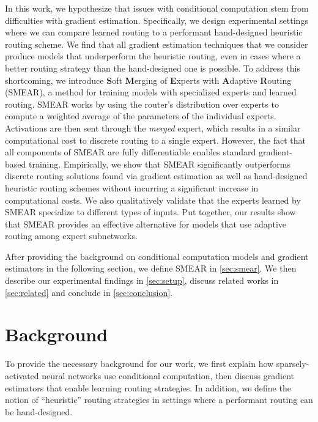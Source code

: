 \documentclass{article}
\theoremstyle{plain}
\theoremstyle{definition}
\theoremstyle{remark}
\begin{document}
In this work, we hypothesize that issues with conditional computation stem from difficulties with gradient estimation.
Specifically, we design experimental settings where we can compare learned routing to a performant hand-designed heuristic routing scheme.
We find that all gradient estimation techniques that we consider produce models that underperform the heuristic routing, even in cases where a better routing strategy than the hand-designed one is possible.
To address this shortcoming, we introduce \textbf{S}oft \textbf{M}erging of \textbf{E}xperts with \textbf{A}daptive \textbf{R}outing (SMEAR), a method for training models with specialized experts and learned routing.
SMEAR works by using the router's distribution over experts to compute a weighted average of the parameters of the individual experts.
Activations are then sent through the \textit{merged} expert, which results in a similar computational cost to discrete routing to a single expert.
However, the fact that all components of SMEAR are fully differentiable enables standard gradient-based training.
Empirically, we show that SMEAR significantly outperforms discrete routing solutions found via gradient estimation as well as hand-designed heuristic routing schemes without incurring a significant increase in computational costs.
We also qualitatively validate that the experts learned by SMEAR specialize to different types of inputs.
Put together, our results show that SMEAR provides an effective alternative for models that use adaptive routing among expert subnetworks.

After providing the background on conditional computation models and gradient estimators in the following section, we define SMEAR in \cref{sec:smear}.
We then describe our experimental findings in \cref{sec:setup}, discuss related works in \cref{sec:related} and conclude in \cref{sec:conclusion}.

\section{Background}
\label{sec:background}

To provide the necessary background for our work, we first explain how sparsely-activated neural networks use conditional computation, then discuss gradient estimators that enable learning routing strategies.
In addition, we define the notion of ``heuristic'' routing strategies in settings where a performant routing can be hand-designed.
\end{document}
